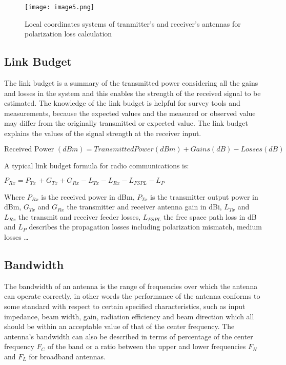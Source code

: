 \begin{figure}[H]
	\begin{center}
		\texttt{[image: image5.png]}
		\caption{\label{2Dpattern} Local coordinates systems of tranmitter's and receiver's antennas for polarization loss calculation \cite{balanis}}
	\end{center}
\end{figure}




\subsection{Link Budget}

 The link budget is a summary of the transmitted power considering all the gains and losses in the system and this enables the strength of the received signal to be estimated. The knowledge of the link budget is helpful for survey tools and measurements, because the expected values and the measured or observed value may differ from the originally transmitted or expected value. The link budget explains the values of the signal strength at the receiver input.

$\text{Received Power } \left( dBm \right) =Transmitted Power  \left( dBm \right) +Gains  \left( dB \right) -Losses  \left( dB \right)$

A typical link budget formula for radio communications is:

$P_{Rx}= P_{Tx~}+G_{Tx}+ G_{Rx}-L_{Tx}-L_{Rx}-L_{FSPL}-L_{P}$



Where $P_{Rx}$ is the received power in dBm, $P_{Tx}$ is the transmitter output power in dBm, $G_{Tx}$ and $G_{Rx}$ the transmitter and receiver antenna gain in dBi, $L_{Tx}$ and $L_{Rx}$ the transmit and receiver feeder losses, $L_{FSPL}$ the free space path loss in dB and $L_{P}$ describes the propagation losses including polarization mismatch, medium losses \ldots

\subsection{Bandwidth}

The bandwidth of an antenna is the range of frequencies over which the antenna can operate correctly, in other words the performance of the antenna conforms to some standard with respect to certain specified characteristics, such as input impedance, beam width, gain, radiation efficiency and beam direction which all should be within an acceptable value of that of the center frequency. The antenna’s bandwidth can also be described in terms of percentage of the center frequency $F_{C}$ of the band or a ratio between the upper and lower frequencies $F_{H}$  and $F_{L}$ for broadband antennas.

